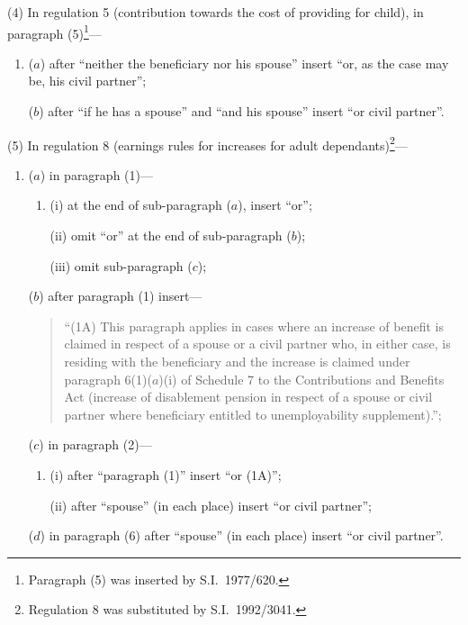 \documentclass[12pt,a4paper]{article}
\begin{document}
(4) In regulation 5 (contribution towards the cost of providing for child), in paragraph (5)\footnote{Paragraph (5) was inserted by S.I.\ 1977/620.}—
\begin{enumerate}\item[]
($a$) after “neither the beneficiary nor his spouse” insert “or, as the case may be, his civil partner”;

($b$) after “if he has a spouse” and “and his spouse” insert “or civil partner”.
\end{enumerate}

(5) In regulation 8 (earnings rules for increases for adult dependants)\footnote{Regulation 8 was substituted by S.I.\ 1992/3041.}—
\begin{enumerate}\item[]
($a$) in paragraph (1)—
\begin{enumerate}\item[]
(i) at the end of sub-paragraph ($a$), insert “or”;

(ii) omit “or” at the end of sub-paragraph ($b$);

(iii) omit sub-paragraph ($c$);
\end{enumerate}

($b$) after paragraph (1) insert—
\begin{quotation}
“(1A) This paragraph applies in cases where an increase of benefit is claimed in respect of a spouse or a civil partner who, in either case, is residing with the beneficiary and the increase is claimed under paragraph 6(1)($a$)(i)  of Schedule 7 to the Contributions and Benefits Act (increase of disablement pension in respect of a spouse or civil partner where beneficiary entitled to unemployability supplement).”;
\end{quotation}

($c$) in paragraph (2)—
\begin{enumerate}\item[]
(i) after “paragraph (1)” insert “or (1A)”;

(ii) after “spouse” (in each place) insert “or civil partner”;
\end{enumerate}

($d$) in paragraph (6) after “spouse” (in each place) insert “or civil partner”.
\end{enumerate}
\end{document}
